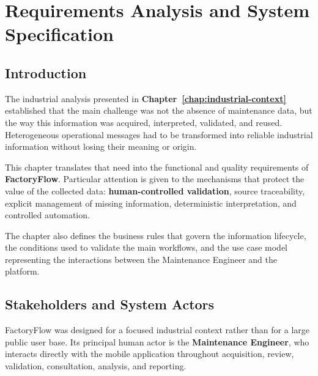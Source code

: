 \chapter{Requirements Analysis and System Specification}
\label{chap:requirements}


\section{Introduction}
\label{sec:requirements-introduction}

The industrial analysis presented in
\textbf{Chapter~\ref{chap:industrial-context}}
established that the main challenge was not the absence of maintenance data,
but the way this information was acquired, interpreted, validated, and reused.
Heterogeneous operational messages had to be transformed into reliable
industrial information without losing their meaning or origin.

This chapter translates that need into the functional and quality requirements
of \textbf{FactoryFlow}. Particular attention is given to the mechanisms that
protect the value of the collected data: \textbf{human-controlled validation},
source traceability, explicit management of missing information, deterministic
interpretation, and controlled automation.

The chapter also defines the business rules that govern the information
lifecycle, the conditions used to validate the main workflows, and the use case
model representing the interactions between the Maintenance Engineer and the
platform.



\section{Stakeholders and System Actors}
\label{sec:stakeholders}

FactoryFlow was designed for a focused industrial context rather than for a
large public user base. Its principal human actor is the
\textbf{Maintenance Engineer}, who interacts directly with the mobile
application throughout acquisition, review, validation, consultation,
analysis, and reporting.

